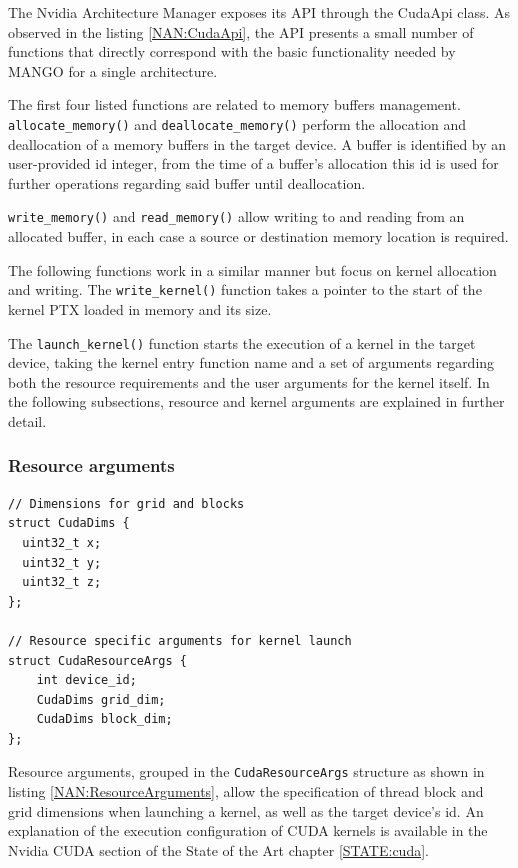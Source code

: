 The Nvidia Architecture Manager exposes its API through the CudaApi class. As observed in the listing \ref{NAN:CudaApi}, the API presents a small number of functions that directly correspond with the basic functionality needed by MANGO for a single architecture.

The first four listed functions are related to memory buffers management.\linebreak
\texttt{allocate\_memory()} and \texttt{deallocate\_memory()} perform the allocation and deallocation of a memory buffers in the target device. A buffer is identified by an user-provided id integer, from the time of a buffer's allocation this id is used for further operations regarding said buffer until deallocation. 

\texttt{write\_memory()} and \texttt{read\_memory()} allow writing to and reading from an allocated buffer, in each case a source or destination memory location is required.

The following functions work in a similar manner but focus on kernel allocation and writing. The \texttt{write\_kernel()} function takes a pointer to the start of the kernel PTX loaded in memory and its size.

The \texttt{launch\_kernel()} function starts the execution of a kernel in the target device, taking the kernel entry function name and a set of arguments regarding both the resource requirements and the user arguments for the kernel itself. In the following subsections, resource and kernel arguments are explained in further detail.

\subsubsection{Resource arguments}

\begin{lstlisting}[style=CStyle, label=NAN:ResourceArguments, caption=Nvidia Architecture Manager - Resource arguments]
// Dimensions for grid and blocks
struct CudaDims {
  uint32_t x;
  uint32_t y;
  uint32_t z;
};

// Resource specific arguments for kernel launch
struct CudaResourceArgs {
    int device_id;
    CudaDims grid_dim;
    CudaDims block_dim;
};
\end{lstlisting}

Resource arguments, grouped in the \texttt{CudaResourceArgs} structure as shown in listing \ref{NAN:ResourceArguments}, allow the specification of thread block and grid dimensions when launching a kernel, as well as the target device's id. An explanation of the execution configuration of CUDA kernels is available in the Nvidia CUDA section of the State of the Art chapter \ref{STATE:cuda}.

